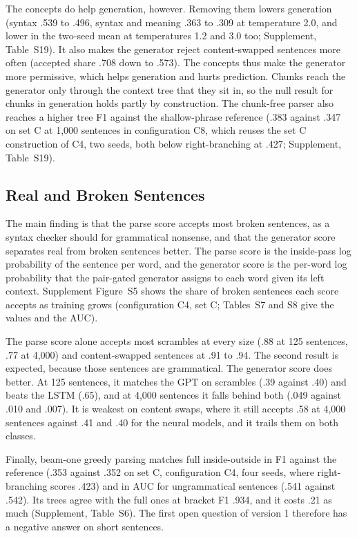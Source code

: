 \documentclass[11pt,letterpaper]{article}
\begin{document}
The concepts do help generation, however. Removing them lowers generation (syntax .539 to .496, syntax and meaning .363 to .309 at temperature 2.0, and lower in the two-seed mean at temperatures 1.2 and 3.0 too; Supplement, Table~S19).
It also makes the generator reject content-swapped sentences more often (accepted share .708 down to .573). The concepts thus make the generator more permissive, which helps generation and hurts prediction.
Chunks reach the generator only through the context tree that they sit in, so the null result for chunks in generation holds partly by construction.
The chunk-free parser also reaches a higher tree F1 against the shallow-phrase reference (.383 against .347 on set C at 1,000 sentences in configuration C8, which reuses the set C construction of C4, two seeds, both below right-branching at .427; Supplement, Table~S19).

\subsection{Real and Broken Sentences}

The main finding is that the parse score accepts most broken sentences, as a syntax checker should for grammatical nonsense, and that the generator score separates real from broken sentences better.
The parse score is the inside-pass log probability of the sentence per word, and the generator score is the per-word log probability that the pair-gated generator assigns to each word given its left context.
Supplement Figure~S5 shows the share of broken sentences each score accepts as training grows (configuration C4, set C; Tables~S7 and S8 give the values and the AUC).

The parse score alone accepts most scrambles at every size (.88 at 125 sentences, .77 at 4,000) and content-swapped sentences at .91 to .94. The second result is expected, because those sentences are grammatical.
The generator score does better. At 125 sentences, it matches the GPT on scrambles (.39 against .40) and beats the LSTM (.65), and at 4,000 sentences it falls behind both (.049 against .010 and .007).
It is weakest on content swaps, where it still accepts .58 at 4,000 sentences against .41 and .40 for the neural models, and it trails them on both classes.

Finally, beam-one greedy parsing matches full inside-outside in F1 against the reference (.353 against .352 on set C, configuration C4, four seeds, where right-branching scores .423) and in AUC for ungrammatical sentences (.541 against .542).
Its trees agree with the full ones at bracket F1 .934, and it costs .21 as much (Supplement, Table~S6).
The first open question of version 1 therefore has a negative answer on short sentences.
\end{document}
